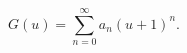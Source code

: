 \begin{equation}
\label{ansatza}
G(u) = \sum_{n=0}^{\infty} a_n \left(u+1 \right)^n.
\end{equation}

